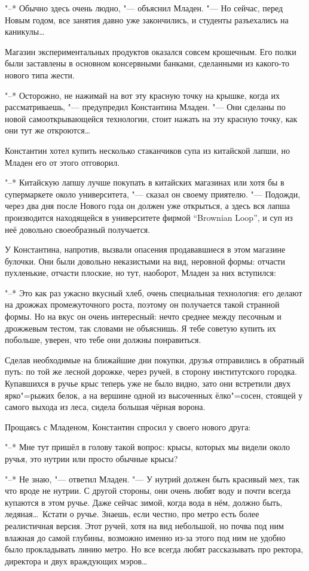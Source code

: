 "--* Обычно здесь очень людно, "--- объяснил Младен.
"--- Но сейчас, перед Новым годом, все занятия давно уже закончились, и студенты
разъехались на каникулы\ldots

Магазин экспериментальных продуктов оказался совсем крошечным.
Его полки были заставлены в основном консервными банками, сделанными из
какого-то нового типа жести.

"--* Осторожно, не нажимай на вот эту красную точку на крышке, когда их
рассматриваешь, "--- предупредил Константина Младен.
"--- Они сделаны по новой самооткрывающейся технологии, стоит нажать на эту
красную точку, как они тут же откроются\ldots

Константин хотел купить несколько стаканчиков супа из китайской лапши, но Младен
его от этого отговорил.

"--* Китайскую лапшу лучше покупать в китайских магазинах или хотя бы в
супермаркете около университета, "--- сказал он своему приятелю.
"--- Подожди, через два дня после Нового года он должен уже открыться, а здесь
вся лапша производится находящейся в университете фирмой
\enquote{\foreignlanguage{english}{Brownian Loop}},
и суп из неё довольно своеобразный получается.

У Константина, напротив, вызвали опасения продававшиеся в этом магазине булочки.
Они были довольно неказистыми на вид, неровной формы: отчасти пухленькие,
отчасти плоские, но тут, наоборот, Младен за них вступился:

"--* Это как раз ужасно вкусный хлеб, очень специальная технология: его делают
на дрожжах промежуточного роста, поэтому он получается такой странной формы.
Но на вкус он очень интересный: нечто среднее между песочным и дрожжевым тестом,
так словами не объяснишь.
Я тебе советую купить их побольше, уверен, что тебе они должны понравиться.

Сделав необходимые на ближайшие дни покупки, друзья отправились в обратный путь:
по той же лесной дорожке, через ручей, в сторону институтского городка.
Купавшихся в ручье крыс теперь уже не было видно, зато они встретили двух
ярко"=рыжих белок, а на вершине одной из высоченных ёлко"=сосен, стоящей у
самого выхода из леса, сидела большая чёрная ворона.

Прощаясь с Младеном, Константин спросил у своего нового друга:

"--* Мне тут пришёл в голову такой вопрос: крысы, которых мы видели около ручья,
это нутрии или просто обычные крысы?

"--* Не знаю, "--- ответил Младен.
"--- У нутрий должен быть красивый мех, так что вроде не нутрии.
С другой стороны, они очень любят воду и почти всегда купаются в этом ручье.
Даже сейчас зимой, когда вода в нём, должно быть, ледяная\ldots\
Кстати о ручье.
Знаешь, если честно, про метро есть более реалистичная версия.
Этот ручей, хотя на вид небольшой, но почва под ним влажная до самой глубины,
возможно именно из-за этого под ним не удобно было прокладывать линию метро.
Но все всегда любят рассказывать про ректора, директора и двух враждующих
мэров\ldots

